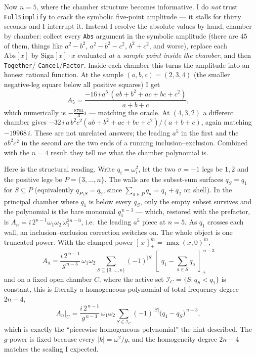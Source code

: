 \documentclass{article}
\newcommand{\pp}[1]{\left[\,#1\,\right]_{+}}
\begin{document}
Now $n=5$, where the chamber structure becomes informative. I do \emph{not} trust
\texttt{FullSimplify} to crack the symbolic five-point amplitude --- it stalls for
thirty seconds and I interrupt it. Instead I resolve the absolute values by hand,
chamber by chamber: collect every \texttt{Abs} argument in the symbolic amplitude
(there are $45$ of them, things like $a^2-b^2$, $a^2-b^2-c^2$, $b^2+c^2$, and
worse), replace each $\mathrm{Abs}[x]$ by $\mathrm{Sign}[x]\cdot x$ evaluated
\emph{at a sample point inside the chamber}, and then \texttt{Together}/%
\texttt{Cancel}/\texttt{Factor}. Inside each chamber this turns the amplitude into
an honest rational function. At the sample $(a,b,c)=(2,3,4)$ (the smaller
negative-leg square below all positive squares) I get
\[
A_5=\frac{-16\,i\,a^5\,(ab+b^2+ac+bc+c^2)}{a+b+c},
\]
which numerically is $-\tfrac{8704}{3}i$ --- matching the oracle. At
$(4,3,2)$ a different chamber gives
$-32\,i\,a\,b^2c^2(ab+b^2+ac+bc+c^2)/(a+b+c)$, again matching $-19968\,i$. These
are not unrelated answers; the leading $a^5$ in the first and the $ab^2c^2$ in the
second are the two ends of a running inclusion--exclusion. Combined with the
$n=4$ result they tell me what the chamber polynomial is.

Here is the structural reading. Write $q_i=\omega_i^2$, let the two $\sigma=-1$
legs be $1,2$ and the positive legs be $P=\{3,\dots,n\}$. The walls are the
subset-sum surfaces $q_S=q_1$ for $S\subseteq P$ (equivalently
$q_{P\setminus S}=q_2$, since $\sum_{a\in P}q_a=q_1+q_2$ on shell). In the
principal chamber where $q_1$ is below every $q_S$, only the empty subset survives and
the polynomial is the bare monomial $q_1^{\,n-3}$ --- which, restored with the
prefactor, is $A_n=i\,2^{n-1}\omega_1\omega_2\,\omega_1^{2n-6}$, i.e.\ the leading
$a^5$ piece at $n=5$. As $q_1$ crosses each wall, an inclusion--exclusion
correction switches on. The whole object is one truncated power. With the
clamped power $\pp{x}^m=\max(x,0)^m$,
\[
\boxed{\;
A_n
=
\frac{i\,2^{\,n-1}}{g^{\,n-3}}\,\omega_1\omega_2
\sum_{S\subseteq\{3,\dots,n\}}(-1)^{|S|}\,
\pp{\,q_1-\textstyle\sum_{a\in S}q_a\,}^{\,n-3}\;}
\]
and on a fixed open chamber $C$, where the active set
$\mathcal I_C=\{S:q_S<q_1\}$ is constant, this is literally a homogeneous
polynomial of total frequency degree $2n-4$,
\[
A_n\big|_C
=
\frac{i\,2^{\,n-1}}{g^{\,n-3}}\,\omega_1\omega_2
\sum_{S\in\mathcal I_C}(-1)^{|S|}\big(q_1-q_S\big)^{\,n-3},
\]
which is exactly the ``piecewise homogeneous polynomial'' the hint described. The
$g$-power is fixed because every $|k|=\omega^2/g$, and the homogeneity degree
$2n-4$ matches the scaling I expected.
\end{document}
